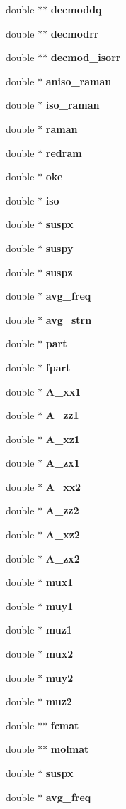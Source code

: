\begin{CompactItemize}
double $\ast$$\ast$ {\bf decmoddq}
\item 
double $\ast$$\ast$ {\bf decmodrr}
\item 
double $\ast$$\ast$ {\bf decmod\_\-isorr}
\item 
double $\ast$ {\bf aniso\_\-raman}
\item 
double $\ast$ {\bf iso\_\-raman}
\item 
double $\ast$ {\bf raman}
\item 
double $\ast$ {\bf redram}
\item 
double $\ast$ {\bf oke}
\item 
double $\ast$ {\bf iso}
\item 
double $\ast$ {\bf suspx}
\item 
double $\ast$ {\bf suspy}
\item 
double $\ast$ {\bf suspz}
\item 
double $\ast$ {\bf avg\_\-freq}
\item 
double $\ast$ {\bf avg\_\-strn}
\item 
double $\ast$ {\bf part}
\item 
double $\ast$ {\bf fpart}
\item 
double $\ast$ {\bf A\_\-xx1}
\item 
double $\ast$ {\bf A\_\-zz1}
\item 
double $\ast$ {\bf A\_\-xz1}
\item 
double $\ast$ {\bf A\_\-zx1}
\item 
double $\ast$ {\bf A\_\-xx2}
\item 
double $\ast$ {\bf A\_\-zz2}
\item 
double $\ast$ {\bf A\_\-xz2}
\item 
double $\ast$ {\bf A\_\-zx2}
\item 
double $\ast$ {\bf mux1}
\item 
double $\ast$ {\bf muy1}
\item 
double $\ast$ {\bf muz1}
\item 
double $\ast$ {\bf mux2}
\item 
double $\ast$ {\bf muy2}
\item 
double $\ast$ {\bf muz2}
\item 
double $\ast$$\ast$ {\bf fcmat}
\item 
double $\ast$$\ast$ {\bf molmat}
\item 
double $\ast$ {\bf suspx}
\item 
double $\ast$ {\bf avg\_\-freq}
\end{CompactItemize}


